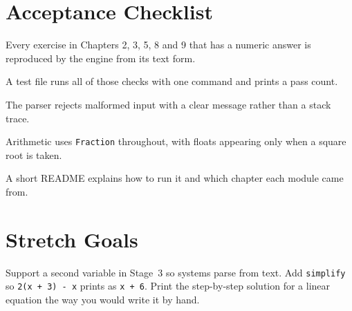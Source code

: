\section{Acceptance Checklist}

\begin{checklist}
\item Every exercise in Chapters 2, 3, 5, 8 and 9 that has a numeric answer is reproduced by the engine from its text form.
\item A test file runs all of those checks with one command and prints a pass count.
\item The parser rejects malformed input with a clear message rather than a stack trace.
\item Arithmetic uses \lstinline!Fraction! throughout, with floats appearing only when a square root is taken.
\item A short README explains how to run it and which chapter each module came from.
\end{checklist}

\section{Stretch Goals}

Support a second variable in Stage~3 so systems parse from text. Add \lstinline!simplify! so \lstinline!2(x + 3) - x! prints as \lstinline!x + 6!. Print the step-by-step solution for a linear equation the way you would write it by hand.
